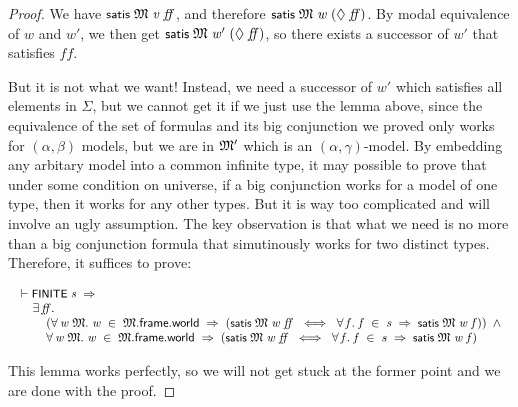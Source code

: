 \documentclass[letterpaper]{article}
\renewcommand{\HOLConst}[1]{{\textsf{\upshape\small #1}}}
\renewcommand{\HOLinline}[1]{\ensuremath{#1}}
\newenvironment{holmath}{\begin{displaymath}\begin{array}{l}}{\end{array}\end{displaymath}\ignorespacesafterend}
\begin{document}
\begin{proof}
We have \HOLinline{\HOLConst{satis}\;\HOLFreeVar{\ensuremath{\mathfrak{M}}}\;\HOLFreeVar{v}\;\HOLFreeVar{ff}}, and therefore \HOLinline{\HOLConst{satis}\;\HOLFreeVar{\ensuremath{\mathfrak{M}}}\;\HOLFreeVar{w}\;(\HOLSymConst{\ensuremath{\Diamond}}\;\HOLFreeVar{ff})}. By modal equivalence of $w$ and $w'$, we then get \HOLinline{\HOLConst{satis}\;\HOLFreeVar{\ensuremath{\mathfrak{M}}}\;\HOLFreeVar{w\sp{\prime}}\;(\HOLSymConst{\ensuremath{\Diamond}}\;\HOLFreeVar{ff})}, so there exists a successor of $w'$ that satisfies $ff$. 

But it is not what we want! Instead, we need a successor of $w'$ which satisfies all elements in $\Sigma$, but we cannot get it if we just use the lemma above, since the equivalence of the set of formulas and its big conjunction we proved only works for $(\alpha,\beta)$ models, but we are in \HOLinline{\HOLFreeVar{\ensuremath{\mathfrak{M}'}}} which is an $(\alpha,\gamma)$-model. By embedding any arbitary model into a common infinite type, it may possible to prove that under some condition on universe, if a big conjunction works for a model of one type, then it works for any other types. But it is way too complicated and will involve an ugly assumption. The key observation is that what we need is no more than a big conjunction formula that simutinously works for two distinct types. Therefore, it suffices to prove:

\begin{holmath}
  \ensuremath{\HOLTokenTurnstile}\HOLConst{FINITE}\;\HOLFreeVar{s}\;\HOLSymConst{\HOLTokenImp{}}\\
\;\;\;\;\;\HOLSymConst{\HOLTokenExists{}}\HOLBoundVar{ff}.\\
\;\;\;\;\;\;\;\;\;(\HOLSymConst{\HOLTokenForall{}}\HOLBoundVar{w}\;\HOLBoundVar{\ensuremath{\mathfrak{M}}}.\;\HOLBoundVar{w}\;\HOLSymConst{\HOLTokenIn{}}\;\HOLBoundVar{\ensuremath{\mathfrak{M}}}.\HOLFieldName{frame}.\HOLFieldName{world}\;\HOLSymConst{\HOLTokenImp{}}\;(\HOLConst{satis}\;\HOLBoundVar{\ensuremath{\mathfrak{M}}}\;\HOLBoundVar{w}\;\HOLBoundVar{ff}\;\HOLSymConst{\HOLTokenEquiv{}}\;\HOLSymConst{\HOLTokenForall{}}\HOLBoundVar{f}.\;\HOLBoundVar{f}\;\HOLSymConst{\HOLTokenIn{}}\;\HOLFreeVar{s}\;\HOLSymConst{\HOLTokenImp{}}\;\HOLConst{satis}\;\HOLBoundVar{\ensuremath{\mathfrak{M}}}\;\HOLBoundVar{w}\;\HOLBoundVar{f}))\;\HOLSymConst{\HOLTokenConj{}}\\
\;\;\;\;\;\;\;\;\;\HOLSymConst{\HOLTokenForall{}}\HOLBoundVar{w}\;\HOLBoundVar{\ensuremath{\mathfrak{M}}}.\;\HOLBoundVar{w}\;\HOLSymConst{\HOLTokenIn{}}\;\HOLBoundVar{\ensuremath{\mathfrak{M}}}.\HOLFieldName{frame}.\HOLFieldName{world}\;\HOLSymConst{\HOLTokenImp{}}\;(\HOLConst{satis}\;\HOLBoundVar{\ensuremath{\mathfrak{M}}}\;\HOLBoundVar{w}\;\HOLBoundVar{ff}\;\HOLSymConst{\HOLTokenEquiv{}}\;\HOLSymConst{\HOLTokenForall{}}\HOLBoundVar{f}.\;\HOLBoundVar{f}\;\HOLSymConst{\HOLTokenIn{}}\;\HOLFreeVar{s}\;\HOLSymConst{\HOLTokenImp{}}\;\HOLConst{satis}\;\HOLBoundVar{\ensuremath{\mathfrak{M}}}\;\HOLBoundVar{w}\;\HOLBoundVar{f})
\end{holmath}

This lemma works perfectly, so we will not get stuck at the former point and we are done with the proof.
\end{proof}
\end{document}
